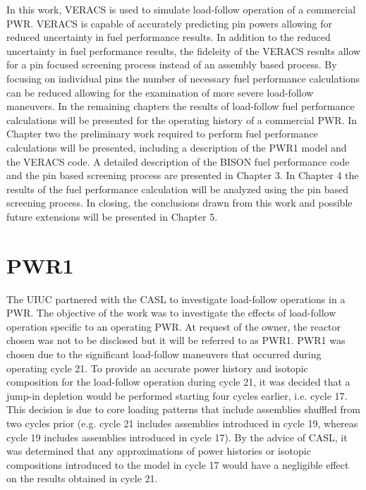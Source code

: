 \documentclass[edeposit,fullpage,11pt]{uiucthesis2009}
\begin{document}
In this work, \gls{VERACS} is used to simulate load-follow operation of a commercial \gls{PWR}.
\gls{VERACS} is capable of accurately predicting pin powers allowing for reduced uncertainty in fuel performance results.
In addition to the reduced uncertainty in fuel performance results, the fideleity of the \gls{VERACS} results allow for a pin focused screening process instead of an assembly based process.
By focusing on individual pins the number of necessary fuel performance calculations can be reduced allowing for the examination of more severe load-follow maneuvers.
In the remaining chapters the results of load-follow fuel performance calculations will be presented for the operating history of a commercial \gls{PWR}.
In Chapter two the preliminary work required to perform fuel performance calculations will be presented, including a description of the PWR1 model and the \gls{VERACS} code. 
A detailed description of the BISON fuel performance code and the pin based screening process are presented in Chapter 3.
In Chapter 4 the results of the fuel performance calculation will be analyzed using the pin based screening process.
In closing, the conclusions drawn from this work and possible future extensions will be presented in Chapter 5.


\chapter{PWR1}
The \gls{UIUC} partnered with the \gls{CASL} to investigate load-follow operations in a PWR. 
The objective of the work was to investigate the effects of load-follow operation specific to an operating PWR. 
At request of the owner, the reactor chosen was not to be disclosed but it will be referred to as PWR1.
PWR1 was chosen due to the significant load-follow maneuvers that occurred during operating cycle 21. 
To provide an accurate power history and isotopic composition for the load-follow operation during cycle 21, it was decided that a jump-in depletion would be performed starting four cycles earlier, i.e. cycle 17. 
This decision is due to core loading patterns that include assemblies shuffled from two cycles prior (e.g. cycle 21 includes assemblies introduced in cycle 19, whereas cycle 19 includes assemblies introduced in cycle 17). 
By the advice of \gls{CASL}, it was determined that any approximations of power histories or isotopic compositions introduced to the model in cycle 17 would have a negligible effect on the results obtained in cycle 21.
\end{document}
